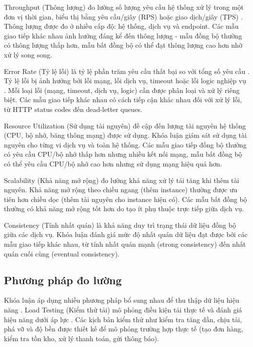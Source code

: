 Throughput (Thông lượng) đo lường số lượng yêu cầu hệ thống xử lý trong một đơn vị thời gian, biểu thị bằng yêu cầu/giây (RPS) hoặc giao dịch/giây (TPS) \cite{jun2018}. Thông lượng được đo ở nhiều cấp độ: hệ thống, dịch vụ và endpoint. Các mẫu giao tiếp khác nhau ảnh hưởng đáng kể đến thông lượng - mẫu đồng bộ thường có thông lượng thấp hơn, mẫu bất đồng bộ có thể đạt thông lượng cao hơn nhờ xử lý song song.

Error Rate (Tỷ lệ lỗi) là tỷ lệ phần trăm yêu cầu thất bại so với tổng số yêu cầu \cite{newman2015}. Tỷ lệ lỗi bị ảnh hưởng bởi lỗi mạng, lỗi dịch vụ, timeout hoặc lỗi logic nghiệp vụ \cite{richardson2019}. Mỗi loại lỗi (mạng, timeout, dịch vụ, logic) cần được phân loại và xử lý riêng biệt. Các mẫu giao tiếp khác nhau có cách tiếp cận khác nhau đối với xử lý lỗi, từ HTTP status codes đến dead-letter queues.

Resource Utilization (Sử dụng tài nguyên) đề cập đến lượng tài nguyên hệ thống (CPU, bộ nhớ, băng thông mạng) được sử dụng. Khóa luận giám sát sử dụng tài nguyên cho từng vi dịch vụ và toàn hệ thống. Các mẫu giao tiếp đồng bộ thường có yêu cầu CPU/bộ nhớ thấp hơn nhưng nhiều kết nối mạng, mẫu bất đồng bộ có thể yêu cầu CPU/bộ nhớ cao hơn nhưng sử dụng mạng hiệu quả hơn.

Scalability (Khả năng mở rộng) đo lường khả năng xử lý tải tăng khi thêm tài nguyên. Khả năng mở rộng theo chiều ngang (thêm instance) thường được ưu tiên hơn chiều dọc (thêm tài nguyên cho instance hiện có). Các mẫu bất đồng bộ thường có khả năng mở rộng tốt hơn do tạo ít phụ thuộc trực tiếp giữa dịch vụ.

Consistency (Tính nhất quán) là khả năng duy trì trạng thái dữ liệu đồng bộ giữa các dịch vụ. Khóa luận đánh giá mức độ nhất quán dữ liệu đạt được bởi các mẫu giao tiếp khác nhau, từ tính nhất quán mạnh (strong consistency) đến nhất quán cuối cùng (eventual consistency).

\subsection{Phương pháp đo lường}
Khóa luận áp dụng nhiều phương pháp bổ sung nhau để thu thập dữ liệu hiệu năng \cite{newman2015}. Load Testing (Kiểm thử tải) mô phỏng điều kiện tải thực tế và đánh giá hiệu năng dưới áp lực \cite{jun2018}. Các kịch bản kiểm thử như kiểm tra tăng dần, chịu tải, phá vỡ và độ bền được thiết kế để mô phỏng trường hợp thực tế (tạo đơn hàng, kiểm tra tồn kho, xử lý thanh toán, gửi thông báo).

